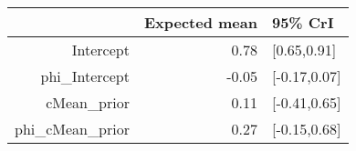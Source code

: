 \begin{tabular}{rrl}
  \hline
 & Expected mean & 95\% CrI \\ 
  \hline
Intercept & 0.78 & [0.65,0.91] \\ 
  phi\_Intercept & -0.05 & [-0.17,0.07] \\ 
  cMean\_prior & 0.11 & [-0.41,0.65] \\ 
  phi\_cMean\_prior & 0.27 & [-0.15,0.68] \\ 
   \hline
\end{tabular}

